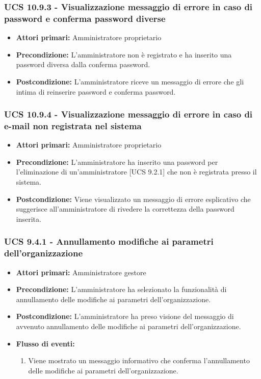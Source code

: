 \subsubsection{UCS 10.9.3 - Visualizzazione messaggio di errore in caso di password e conferma password diverse}%
\begin{itemize}
\item \textbf{Attori primari:} Amministratore proprietario
\item \textbf{Precondizione:} L'amministratore non è registrato e ha inserito una password diversa dalla conferma password.
\item \textbf{Postcondizione:} L'amministratore riceve un messaggio di errore che gli intima di reinserire password e conferma password.
\end{itemize}

\subsubsection{UCS 10.9.4 - Visualizzazione messaggio di errore in caso di e-mail non registrata nel sistema}%
\begin{itemize}
\item \textbf{Attori primari:} Amministratore proprietario
\item \textbf{Precondizione:} L'amministratore ha inserito una password per l'eliminazione di un'amministratore [UCS 9.2.1] che non è registrata presso il sistema.
\item \textbf{Postcondizione:} Viene visualizzato un messaggio di errore esplicativo che suggerisce all'amministratore di rivedere la correttezza della password inserita.
\end{itemize}

\subsubsection{UCS 9.4.1 - Annullamento modifiche ai parametri dell'organizzazione}%
\begin{itemize}
\item \textbf{Attori primari:} Amministratore gestore
\item \textbf{Precondizione:} L'amministratore ha selezionato la funzionalità di annullamento delle modifiche ai parametri dell'organizzazione.
\item \textbf{Postcondizione:} L'amministratore ha preso visione del messaggio di avvenuto annullamento delle modifiche ai parametri dell'organizzazione.
\item \textbf{Flusso di eventi:}
    \begin{enumerate}
        \item Viene mostrato un messaggio informativo che conferma l'annullamento delle modifiche ai parametri dell'organizzazione.
    \end{enumerate} 
\end{itemize}


